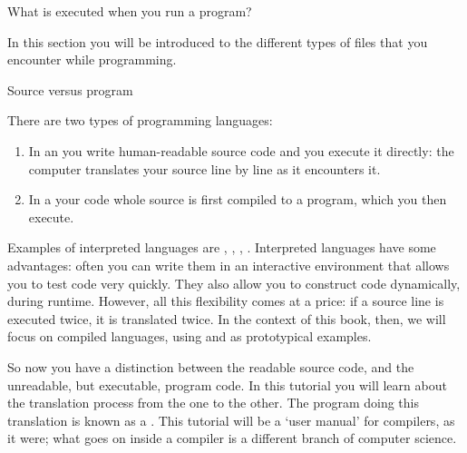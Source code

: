 
 {What is executed when you run a program?}

\begin{purpose}
  In this section you will be introduced to the different types of
  files that you encounter while programming.
\end{purpose}

 {Source versus program}

There are two types of programming languages:
\begin{enumerate}
\item In an  you write
  human-readable source code and you execute it directly: the computer
  translates your source line by line as it encounters it. 
\item In a  your code whole source
  is first compiled to a program, which you then execute.
\end{enumerate}
Examples of interpreted languages are ,
, , .
Interpreted languages have some advantages: often you can write them
in an interactive environment that allows you to test code very
quickly. They also allow you to construct code dynamically, during
runtime. However, all this flexibility comes at a price: if a source
line is executed twice, it is translated twice. In the context of this
book, then, we will focus on compiled languages, using 
and  as prototypical examples.

So now you have
a distinction between the readable source code, and the
unreadable, but executable, program code. In this tutorial you will
learn about the translation process from the one to the other. The
program doing this translation is known as a .
This tutorial will be a `user manual' for compilers, as it were; what
goes on inside a compiler is a different branch of computer science.

